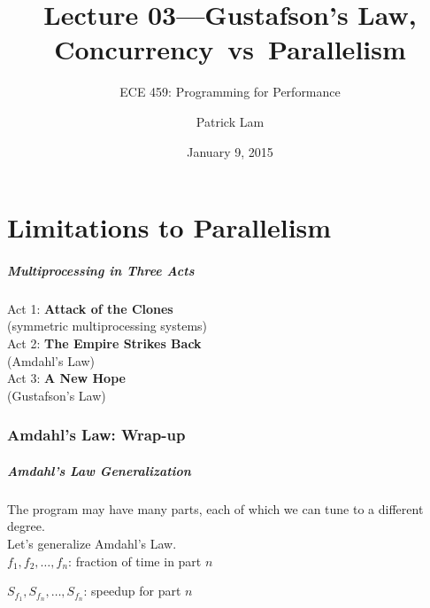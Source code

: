 \documentclass[aspectratio=43]{beamer}
\title{Lecture 03---Gustafson's Law, Concurrency~vs~Parallelism}
\subtitle{ECE 459: Programming for Performance}
\author{Patrick Lam}
\institute{University of Waterloo}
\date{January 9, 2015}
\newenvironment{changemargin}[1]{%
  \begin{list}{}{%
    \setlength{\topsep}{0pt}%
    \setlength{\leftmargin}{#1}%
    \setlength{\rightmargin}{1em}
    \setlength{\listparindent}{\parindent}%
    \setlength{\itemindent}{\parindent}%
    \setlength{\parsep}{\parskip}%
  }%
  \item[]}{\end{list}}
\begin{document}
\begin{frame}[plain]
  \titlepage
\end{frame}

\part{Limitations to Parallelism}

\begin{frame}
  \frametitle{Multiprocessing in Three Acts}

  \begin{changemargin}{2cm}
    Act 1: {\bf Attack of the Clones}\\
    \hspace*{1em} (symmetric multiprocessing systems) \\[1em]
    Act 2: {\bf The Empire Strikes Back}\\
    \hspace*{1em} (Amdahl's Law) \\[1em]
    Act 3: {\bf A New Hope}\\
    \hspace*{1em} (Gustafson's Law)
  \end{changemargin}
\end{frame}

\section{Amdahl's Law: Wrap-up}
\begin{frame}
  \frametitle{Amdahl's Law Generalization}

  \hspace*{2em} \begin{minipage}{.8\textwidth} The program may have many parts, each of which we can tune to
  a different degree.\\[1em]

  Let's generalize Amdahl's Law.\\[1em]

  $f_1, f_2, \ldots, f_n$: fraction of time in part $n$

  $S_{f_1}, S_{f_n}, \ldots, S_{f_n}$: speedup for part $n$
\end{minipage}
  \vfill
  \begin{center}
  \structure{\[\mbox{\em speedup} = \frac{1}{\frac{f_1}{S_{f_1}} + \frac{f_2}{S_{f_2}} + \ldots +
    \frac{f_n}{S_{f_n}}}\]}
  \end{center}
\end{frame}
\end{document}

